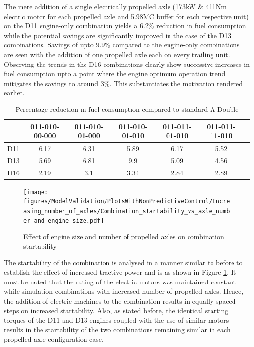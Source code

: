 \documentclass[ExampleMasters.tex]{subfiles}
\begin{document}
The mere addition of a single electrically propelled axle (173kW \& 411Nm electric motor for each propelled axle and 5.98MC buffer for each respective unit) on the D11 engine-only combination yields a 6.2\% reduction in fuel consumption while the potential savings are significantly improved in the case of the D13 combinations. Savings of upto 9.9\% compared to the engine-only combinations are seen with the addition of one propelled axle each on every trailing unit. Observing the trends in the D16 combinations clearly show successive increases in fuel consumption upto a point where the engine optimum operation trend mitigates the savings to around 3\%. This substantiates the motivation rendered earlier.\\
\begin{table}[h!]
\centering
\begin{tabular}{|c|c|c|c|c|c|c|}
\hline
& 011-010-00-000 & 011-010-01-000 & 011-010-01-010 & 011-011-01-010 & 011-011-11-010 \\
\hline
D11 & 6.17 & 6.31 & 5.89 & 6.17 & 5.52 \\
\hline
D13 & 5.69 & 6.81 & 9.9 & 5.09 & 4.56 \\
\hline
D16 & 2.19 & 3.1 & 3.34 & 2.84 & 2.89 \\
\hline
\end{tabular}
\caption{Percentage reduction in fuel consumption compared to standard A-Double}
\label{table:fuelConsumptionReductionAxles}
\end{table}
\begin{figure}[h!]
\centering
\texttt{[image: figures/ModelValidation/PlotsWithNonPredictiveControl/Increasing\_number\_of\_axles/Combination\_startability\_vs\_axle\_number\_and\_engine\_size.pdf]}
\caption{Effect of engine size and number of propelled axles on combination startability}
\label{startabilityEngineNumberOfAxles}
\end{figure}
The startability of the combination is analysed in a manner similar to before to establish the effect of increased tractive power and is as shown in Figure \ref{startabilityEngineNumberOfAxles}. It must be noted that the rating of the electric motors was maintained constant while simulation combinations with increased number of propelled axles. Hence, the addition of electric machines to the combination results in equally spaced steps on increased startability. Also, as stated before, the identical starting torques of the D11 and D13 engines coupled with the use of similar motors results in the startability of the two combinations remaining similar in each propelled axle configuration case.\\
\end{document}
